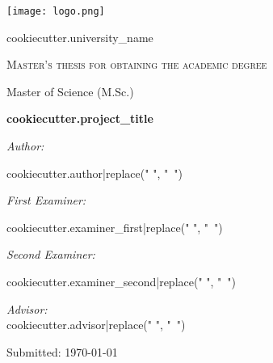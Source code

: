 \begin{titlepage}
	\centering
     
    \texttt{[image: logo.png]}\par
    \vspace{0.7cm}
	{\textsc\LARGE {{cookiecutter.university_name}}}\par
	\vspace{1.2cm}
	{\scshape Master's thesis for obtaining the academic degree \par\glqq Master of Science (M.Sc.)\grqq  \par}
	\vspace{2cm}
	
	{\Large\bfseries {{cookiecutter.project_title}} }\par
	\vspace{1.4cm}
	
	\noindent
    \begin{minipage}[t]{0.4\textwidth}
        \begin{flushleft} \large
            \emph{Author:}\par
            {{cookiecutter.author|replace(" ", "~")}}
        \end{flushleft}        
    \end{minipage}    
    \begin{minipage}[t]{0.5\textwidth}
        \begin{flushright} \large
            \emph{First Examiner:}\par
            {{cookiecutter.examiner_first|replace(" ", "~")}}\par\vspace{0.5cm}
            
            \emph{Second Examiner:}\par
            {{cookiecutter.examiner_second|replace(" ", "~")}}\par\vspace{0.5cm}

            \emph{Advisor:} \\
            {{cookiecutter.advisor|replace(" ", "~")}}\par\vspace{0.5cm}
        \end{flushright}
    \end{minipage}

    \vfill
	
    {\large Submitted:\hspace{1cm} \today}
\end{titlepage}
